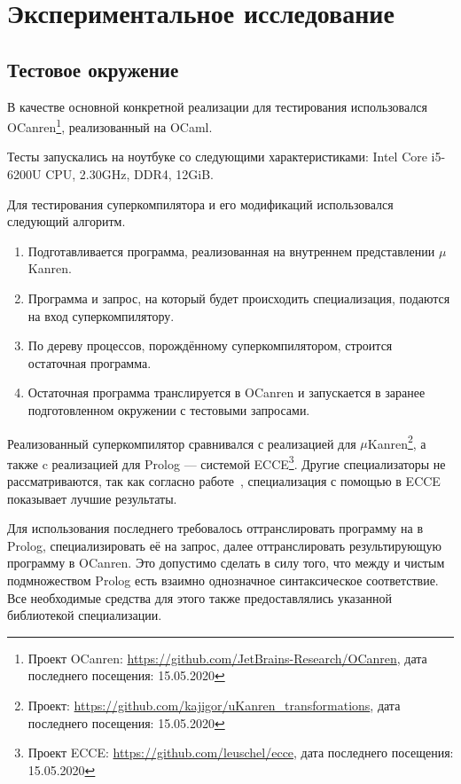 \section{Экспериментальное исследование}
\label{sec:testing}

\subsection{Тестовое окружение}

В качестве основной конкретной реализации \ukanren для тестирования
использовался OCanren\footnote{Проект OCanren: \url{https://github.com/JetBrains-Research/OCanren}, дата последнего посещения: 15.05.2020}\cite{ocanren},
реализованный на OCaml\cite{ocanren}.

Тесты запускались на ноутбуке со следующими характеристиками: Intel Core i5-6200U CPU, 2.30GHz, DDR4, 12GiB.

Для тестирования суперкомпилятора и его модификаций использовался следующий алгоритм.
\begin{enumerate}
\item Подготавливается программа, реализованная на внутреннем представлении $\mu$Kanren.
\item Программа и запрос, на который будет происходить специализация, подаются на вход суперкомпилятору.
\item По дереву процессов, порождённому суперкомпилятором, строится остаточная программа.
\item Остаточная программа транслируется в OCanren и
      запускается в заранее подготовленном окружении с тестовыми запросами.
\end{enumerate}


Реализованный суперкомпилятор сравнивался с реализацией \forcpd для $\mu$Kanren\footnote{Проект: \url{https://github.com/kajigor/uKanren_transformations}, дата последнего посещения: 15.05.2020},
а также c реализацией \forcpd для Prolog --- системой ECCE\footnote{Проект ECCE: \url{https://github.com/leuschel/ecce}, дата последнего посещения: 15.05.2020}.
Другие специализаторы не рассматриваются, так как согласно работе~\cite{controlPoly}, специализация с
помощью \forcpd в ECCE показывает лучшие результаты.

Для использования последнего требовалось оттранслировать программу на \ukanren в Prolog, специализировать
её на запрос, далее оттранслировать результирующую программу в OCanren.
Это допустимо сделать в силу того, что между \ukanren и чистым подмножеством Prolog есть
взаимно однозначное синтаксическое соответствие.
Все необходимые средства для этого также предоставлялись указанной библиотекой специализации.


